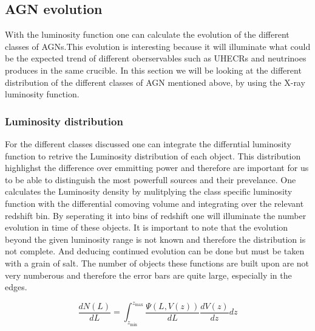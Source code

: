 \documentclass{article}
\begin{document}
\subsection{AGN evolution}
With the luminosity function one can calculate the evolution of the different classes of AGNs.This evolution is interesting because it will 
illuminate what could be the expected trend of different oberservables such as UHECRs and neutrinoes produces in the same crucible.
In this section we will be looking at the different distribution of the different classes of AGN 
mentioned above, by using the X-ray luminosity function. 


\subsubsection{Luminosity distribution}
 
For the different classes discussed one can integrate the differntial luminosity function to retrive the Luminosity distribution of each 
object. This distribution highlighst the difference over emmitting power and therefore are important for us to be able to distinguish the most powerfull 
sources and their prevelance. One calculates the Luminosity density by mulitplying the class specific luminosity
function with the differential comoving volume and integrating over the relevant redshift bin. By seperating it into
bins of redshift one will illuminate the number evolution in time of these objects. It is important to note 
that the evolution beyond the given luminosity range is not known and therefore the distribution is not complete. And deducing continued evolution
can be done but must be taken with a grain of salt. The number of objects these functions are built upon are not very numberous and therefore
the error bars are quite large, especially in the edges. 




\begin{equation}
    \frac{dN(L)}{dL} = \int_{z_{\text{min}}}^{z_{\text{max}}} \frac{\Psi(L, V(z))}{dL} \frac{dV(z)}{dz} dz
\end{equation}
\end{document}

